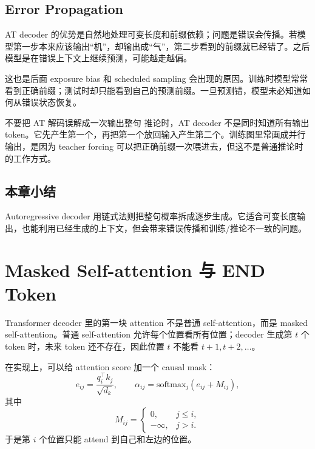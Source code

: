 \documentclass[a4paper]{article}
\begin{document}
\subsection{Error Propagation}

AT decoder 的优势是自然地处理可变长度和前缀依赖；问题是错误会传播。若模型第一步本来应该输出“机”，却输出成“气”，第二步看到的前缀就已经错了。之后模型是在错误上下文上继续预测，可能越走越偏。

这也是后面 exposure bias 和 scheduled sampling 会出现的原因。训练时模型常常看到正确前缀；测试时却只能看到自己的预测前缀。一旦预测错，模型未必知道如何从错误状态恢复。

\begin{warningbox}{不要把 AT 解码误解成一次输出整句}
    推论时，AT decoder 不是同时知道所有输出 token。它先产生第一个，再把第一个放回输入产生第二个。训练图里常画成并行输出，是因为 teacher forcing 可以把正确前缀一次喂进去，但这不是普通推论时的工作方式。
\end{warningbox}

\subsection{本章小结}

Autoregressive decoder 用链式法则把整句概率拆成逐步生成。它适合可变长度输出，也能利用已经生成的上下文，但会带来错误传播和训练/推论不一致的问题。

\section{Masked Self-attention 与 END Token}

Transformer decoder 里的第一块 attention 不是普通 self-attention，而是 masked self-attention。普通 self-attention 允许每个位置看所有位置；decoder 生成第 $t$ 个 token 时，未来 token 还不存在，因此位置 $t$ 不能看 $t+1,t+2,\ldots$。

在实现上，可以给 attention score 加一个 causal mask：
\[
    e_{ij}=\frac{q_i^\top k_j}{\sqrt{d_k}},
    \qquad
    \alpha_{ij}
    =
    \mathrm{softmax}_j(e_{ij}+M_{ij}),
\]
其中
\[
    M_{ij}=
    \begin{cases}
        0, & j\le i,\\
        -\infty, & j>i.
    \end{cases}
\]
于是第 $i$ 个位置只能 attend 到自己和左边的位置。
\end{document}

